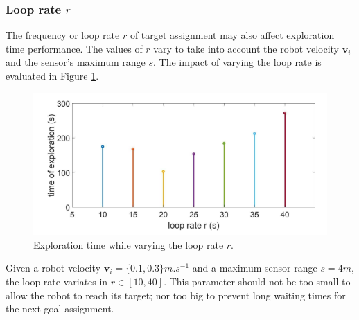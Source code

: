 \documentclass[11pt,openany]{book}
\begin{document}
\subsubsection{Loop rate $r$}
The frequency or loop rate $r$ of target assignment may also aﬀect exploration time performance. The values of $r$ vary to take into account the robot velocity $\mathbf{v}_i$ and the sensor’s maximum range $s$. The impact of varying the loop rate is evaluated in Figure \ref{fig:3.12}.
\begin{figure}[H]
    \centering
    \includegraphics[scale=0.5]{assets/3_12.png}
    \caption{Exploration time while varying the loop rate $r$.}
    \label{fig:3.12}
\end{figure}
Given a robot velocity $\mathbf{v}_i=\{0.1,0.3\}m.s^{-1}$ and a maximum sensor range $s=4m$, the loop rate variates in $r \in [10,40]$. This parameter should not be too small to allow the robot to reach its target; nor too big to prevent long waiting times for the next goal assignment.
\end{document}
